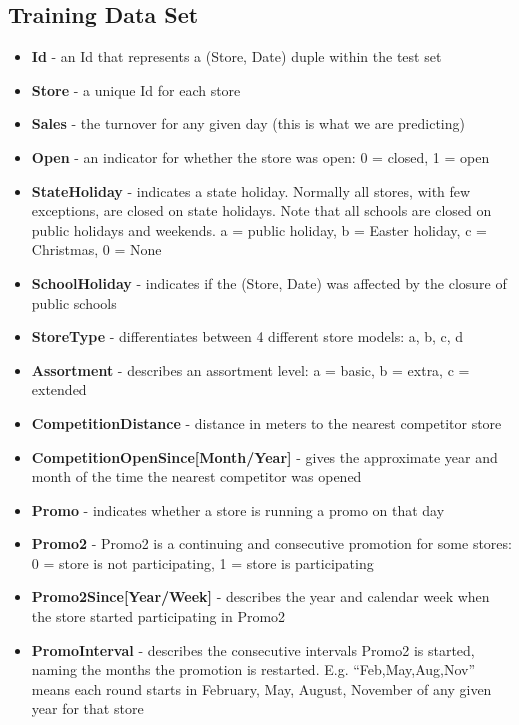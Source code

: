 \documentclass[DIV=calc, paper=a4, fontsize=11pt]{scrartcl}	 %
\begin{document}
\subsection*{Training Data Set}
\begin{itemize}
\item \textbf{Id} - an Id that represents a (Store, Date) duple within the test set
\item \textbf{Store} - a unique Id for each store
\item \textbf{Sales} - the turnover for any given day (this is what we are predicting)
\item \textbf{Open} - an indicator for whether the store was open: 0 = closed, 1 = open
\item \textbf{StateHoliday} - indicates a state holiday. Normally all stores, with few exceptions, are closed on state holidays. Note that all schools are closed on public holidays and weekends. a = public holiday, b = Easter holiday, c = Christmas, 0 = None
\item \textbf{SchoolHoliday} - indicates if the (Store, Date) was affected by the closure of public schools
\item \textbf{StoreType} - differentiates between 4 different store models: a, b, c, d
\item \textbf{Assortment} - describes an assortment level: a = basic, b = extra, c = extended
\item \textbf{CompetitionDistance} - distance in meters to the nearest competitor store
\item \textbf{CompetitionOpenSince[Month/Year]} - gives the approximate year and month of the time the nearest competitor was opened
\item \textbf{Promo} - indicates whether a store is running a promo on that day
\item \textbf{Promo2} - Promo2 is a continuing and consecutive promotion for some stores: 0 = store is not participating, 1 = store is participating
\item \textbf{Promo2Since[Year/Week]} - describes the year and calendar week when the store started participating in Promo2
\item \textbf{PromoInterval} - describes the consecutive intervals Promo2 is started, naming the months the promotion is restarted. E.g. ``Feb,May,Aug,Nov'' means each round starts in February, May, August, November of any given year for that store\cite{RossmannKaggle}

\end{itemize}
\end{document}
